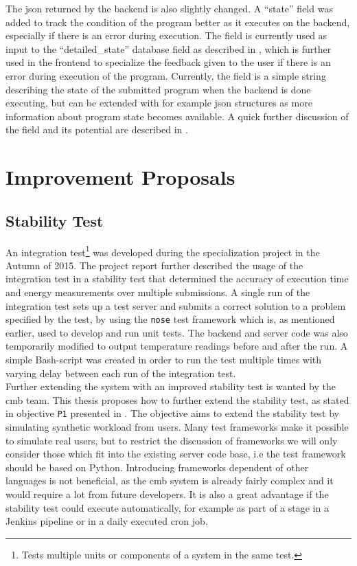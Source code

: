 The \gls{json} returned by the backend is also slightly changed. A ``state'' field was added to track the condition of the program better as it executes on the backend, especially if there is an error during execution. The field is currently used as input to the ``detailed\_state'' database field as described in , which is further used in the frontend to specialize the feedback given to the user if there is an error during execution of the program. Currently, the field is a simple string describing the state of the submitted program when the backend is done executing, but can be extended with for example \gls{json} structures as more information about program state becomes available. A quick further discussion of the field and its potential are described in .

\section{Improvement Proposals}
\label{sec:impr-proposals}

\subsection{Stability Test}
\label{sub-sec:prop-stability-test}
An integration test\footnote{Tests multiple units or components of a system in the same test.} was developed during the specialization project in the Autumn of 2015. The project report further described the usage of the integration test in a stability test that determined the accuracy of execution time and energy measurements over multiple submissions. A single run of the integration test sets up a test server and submits a correct solution to a problem specified by the test, by using the \texttt{nose} test framework which is, as mentioned earlier, used to develop and run unit tests. The backend and server code was also temporarily modified to output temperature readings before and after the run. A simple Bash-script was created in order to run the test multiple times with varying delay between each run of the integration test. \\

Further extending the system with an improved stability test is wanted by the \gls{cmb} team. This thesis proposes how to further extend the stability test, as stated in objective \texttt{P1} presented in . The objective aims to extend the stability test by simulating synthetic workload from users. Many test frameworks make it possible to simulate real users, but to restrict the discussion of frameworks we will only consider those which fit into the existing server code base, i.e the test framework should be based on Python. Introducing frameworks dependent of other languages is not beneficial, as the \gls{cmb} system is already fairly complex and it would require a lot from future developers. It is also a great advantage if the stability test could execute automatically, for example as part of a stage in a Jenkins pipeline or in a daily executed cron job. \\

